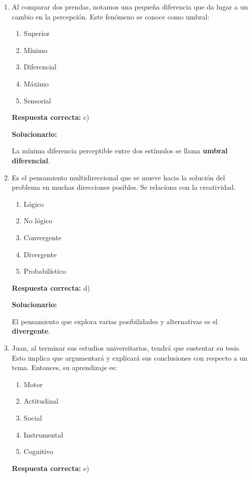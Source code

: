 \begin{enumerate}[resume]

	
	\item Al comparar dos prendas, notamos una pequeña diferencia que da lugar a un cambio en la percepción. Este fenómeno se conoce como umbral:
	\begin{enumerate}[label=\alph*)]
		\item Superior
		\item Mínimo
		\item Diferencial
		\item Máximo
		\item Sensorial
	\end{enumerate}
	\textbf{Respuesta correcta:} c)
	
	\vspace{2mm}
	\textbf{Solucionario:}
	
	La mínima diferencia perceptible entre dos estímulos se llama \textbf{umbral diferencial}.
	
	\vspace{6mm}
	
	\item Es el pensamiento multidireccional que se mueve hacia la solución del problema en muchas direcciones posibles. Se relaciona con la creatividad.
	\begin{enumerate}[label=\alph*)]
		\item Lógico
		\item No lógico
		\item Convergente
		\item Divergente
		\item Probabilístico
	\end{enumerate}
	\textbf{Respuesta correcta:} d)
	
	\vspace{2mm}
	\textbf{Solucionario:}
	
	El pensamiento que explora varias posibilidades y alternativas es el \textbf{divergente}.
	
	\vspace{6mm}
	
	\item Juan, al terminar sus estudios universitarios, tendrá que sustentar su tesis. Esto implica que argumentará y explicará sus conclusiones con respecto a un tema. Entonces, su aprendizaje es:
	\begin{enumerate}[label=\alph*)]
		\item Motor
		\item Actitudinal
		\item Social
		\item Instrumental
		\item Cognitivo
	\end{enumerate}
	\textbf{Respuesta correcta:} e)
	

\end{enumerate}

